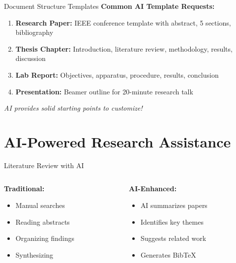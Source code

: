 \documentclass[aspectratio=169]{beamer}
\begin{document}
	\begin{frame}{Document Structure Templates}
		\textbf{Common AI Template Requests:}
		
		\begin{enumerate}
			\item \textbf{Research Paper:} IEEE conference template with abstract, 5 sections, bibliography
			
			\item \textbf{Thesis Chapter:} Introduction, literature review, methodology, results, discussion
			
			\item \textbf{Lab Report:} Objectives, apparatus, procedure, results, conclusion
			
			\item \textbf{Presentation:} Beamer outline for 20-minute research talk
		\end{enumerate}
		
		\vspace{0.5em}
		
		\textit{AI provides solid starting points to customize!}
	\end{frame}
	
	\section{AI-Powered Research Assistance}
	
	\begin{frame}{Literature Review with AI}
		\begin{columns}[t]
			\begin{column}{0.48\textwidth}
				\textbf{Traditional:}
				\begin{itemize}
					\item Manual searches
					\item Reading abstracts
					\item Organizing findings
					\item Synthesizing
				\end{itemize}
			\end{column}
			
			\begin{column}{0.48\textwidth}
				\textbf{AI-Enhanced:}
				\begin{itemize}
					\item AI summarizes papers
					\item Identifies key themes
					\item Suggests related work
					\item Generates BibTeX
				\end{itemize}
			\end{column}
		\end{columns}
	\end{frame}
	
\end{document}

